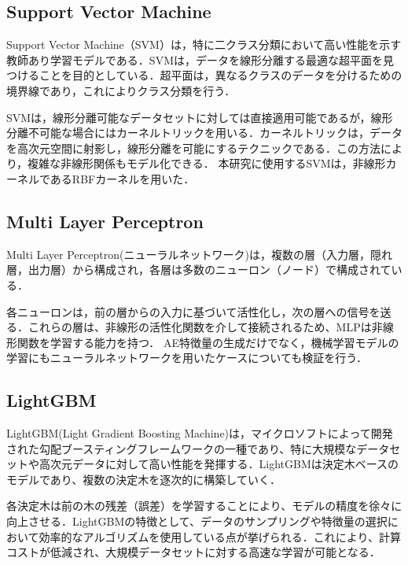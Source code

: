 \subsection{Support Vector Machine}

Support Vector Machine（SVM）は，特に二クラス分類において高い性能を示す教師あり学習モデルである．SVMは，データを線形分離する最適な超平面を見つけることを目的としている．超平面は，異なるクラスのデータを分けるための境界線であり，これによりクラス分類を行う．

SVMは，線形分離可能なデータセットに対しては直接適用可能であるが，線形分離不可能な場合にはカーネルトリックを用いる．カーネルトリックは，データを高次元空間に射影し，線形分離を可能にするテクニックである．この方法により，複雑な非線形関係もモデル化できる．
本研究に使用するSVMは，非線形カーネルであるRBFカーネルを用いた．

\subsection{Multi Layer Perceptron}

Multi Layer Perceptron(ニューラルネットワーク)は，複数の層（入力層，隠れ層，出力層）から構成され，各層は多数のニューロン（ノード）で構成されている．

各ニューロンは，前の層からの入力に基づいて活性化し，次の層への信号を送る．これらの層は、非線形の活性化関数を介して接続されるため、MLPは非線形関数を学習する能力を持つ．
AE特徴量の生成だけでなく，機械学習モデルの学習にもニューラルネットワークを用いたケースについても検証を行う．

\subsection{LightGBM}

LightGBM(Light Gradient Boosting Machine)\cite{lightgbm}は，マイクロソフトによって開発された勾配ブースティングフレームワークの一種であり、特に大規模なデータセットや高次元データに対して高い性能を発揮する．LightGBMは決定木ベースのモデルであり、複数の決定木を逐次的に構築していく．

各決定木は前の木の残差（誤差）を学習することにより、モデルの精度を徐々に向上させる．LightGBMの特徴として、データのサンプリングや特徴量の選択において効率的なアルゴリズムを使用している点が挙げられる．これにより、計算コストが低減され、大規模データセットに対する高速な学習が可能となる．

\newpage